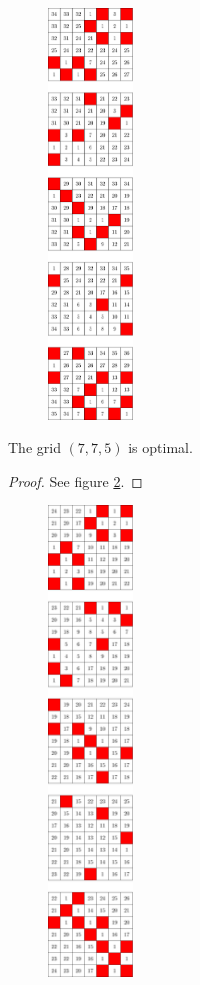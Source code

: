 \begin{figure}[]
\centering
\includegraphics[width=0.2\textwidth]{figures/A/7x6x5_numbered_heatmap.pdf}
\caption{}
\label{fig:7x6x5_numbered_heatmap}
\end{figure}

\begin{con}
\label{con:7x7x5}
The grid $(7,7,5)$ is optimal.
\end{con}

\begin{proof}
See figure \ref{fig:7x7x5_numbered_heatmap}.
\end{proof}

\begin{figure}[]
\centering
\includegraphics[width=0.2\textwidth]{figures/A/7x7x5_numbered_heatmap.pdf}
\caption{}
\label{fig:7x7x5_numbered_heatmap}
\end{figure}


